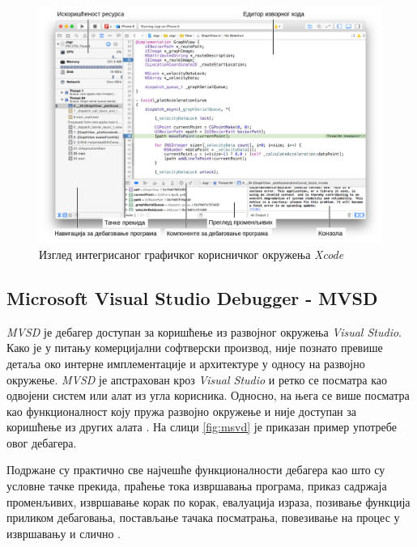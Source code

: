 \documentclass[a4paper]{article}
\begin{document}
\begin{figure}
    \begin{center}
        \includegraphics[width=\textwidth]{slike/xcode.png}
    \end{center}
    \caption{Изглед интегрисаног графичког корисничког окружења {\em Xcode}}
    \label{fig:xcode}
\end{figure}

\subsection{Microsoft Visual Studio Debugger - MVSD}

{\em MVSD} је дебагер доступан за коришћење из развојног 
окружења {\em Visual Studio}. Како је у питању комерцијални
софтверски производ, није познато превише детаља око интерне
имплементације и архитектуре у односу на развојно окружење.
{\em MVSD} је апстрахован кроз {\em Visual Studio} и ретко
се посматра као одвојени систем или алат из угла корисника. 
Односно, на њега се више посматра као функционалност
коју пружа развојно окружење и није доступан за коришћење 
из других алата \cite{msvd}. На слици \ref{fig:msvd} је приказан
пример употребе овог дебагера.

Подржане су практично све најчешће функционалности дебагера
као што су условне тачке прекида, праћење тока извршавања програма, 
приказ садржаја променљивих, извршавање корак по корак, 
евалуација израза, позивање функција приликом дебаговања, 
постављање тачака посматрања, повезивање на процес у извршавању
и слично \cite{msvd}. 
\end{document}
